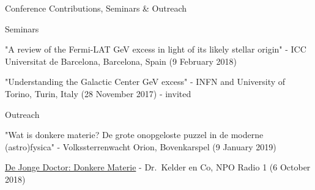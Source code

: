 \begin{rSection}{Conference Contributions, Seminars \& Outreach}
\begin{rSubsection}{Seminars}{}{}{}
\vspace{-1.5em}
    \item "A review of the Fermi-LAT GeV excess in light of its likely stellar origin" - ICC Universitat de Barcelona, Barcelona, Spain (9 February 2018)
    \item "Understanding the Galactic Center GeV excess" - INFN and University of Torino, Turin, Italy (28 November 2017) - invited
\end{rSubsection}

\begin{rSubsection}{Outreach}{}{}{}
\vspace{-1.5em}
    \item "Wat is donkere materie? De grote onopgeloste puzzel in de moderne (astro)fysica" - Volkssterrenwacht Orion,  Bovenkarspel (9 January 2019)
    \item \href{https://www.nporadio1.nl/dr-kelder-en-co/onderwerpen/474112-de-jonge-doctor-donkere-materie}{De Jonge Doctor: Donkere Materie} - Dr.~Kelder en Co, NPO Radio 1 (6 October 2018)
\end{rSubsection}
\end{rSection}
